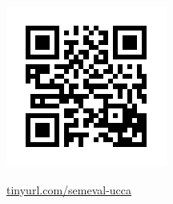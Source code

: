\documentclass[a0,portrait]{a0poster}
\begin{document}
\begin{multicols}{2}
{\begin{multicols}{2}
\begin{adjustbox}{margin=3mm,frame,minipage=1.15\columnwidth}
\begin{minipage}{.3\textwidth}\includegraphics[width=\textwidth]{qr}\end{minipage}
\hfill
\begin{minipage}{.6\textwidth}\Large\url{tinyurl.com/semeval-ucca}\end{minipage}
\end{adjustbox}
\end{multicols}
}

\end{multicols}
\end{document}
